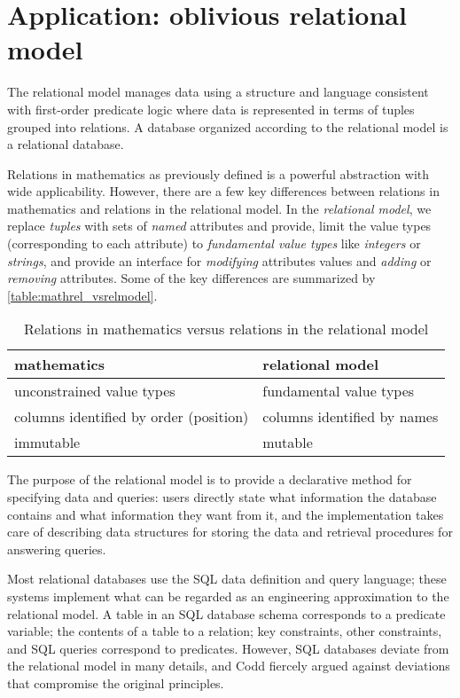 \documentclass[ ../main.tex]{subfiles}
\begin{document}
\section{Application: oblivious relational model}
The relational model manages data using a structure and language consistent with first-order predicate logic\cite{} where data is represented in terms of tuples grouped into relations. A database organized according to the relational model is a relational database.

Relations in mathematics as previously defined is a powerful abstraction with wide applicability. However, there are a few key differences between relations in mathematics and relations in the relational model. In the \emph{relational model}, we replace \emph{tuples} with sets of \emph{named} attributes and provide, limit the value types (corresponding to each attribute) to \emph{fundamental value types} like \emph{integers} or \emph{strings}, and provide an interface for \emph{modifying} attributes values and \emph{adding} or \emph{removing} attributes. Some of the key differences are summarized by \cref{table:mathrel_vsrelmodel}.
\begin{table}
    \label{tab:mathrel_vsrelmodel}
    \centering
    \caption{Relations in mathematics versus relations in the relational model}
    \begin{tabular}{l l}
        \toprule
        mathematics & relational model\\
        \midrule
        unconstrained value types               & fundamental value types\\
        columns identified by order (position)  & columns identified by names\\
        immutable                               & mutable\\
        \bottomrule
    \end{tabular}
\end{table}

The purpose of the relational model is to provide a declarative method for specifying data and queries: users directly state what information the database contains and what information they want from it, and the implementation takes care of describing data structures for storing the data and retrieval procedures for answering queries.

Most relational databases use the SQL data definition and query language; these systems implement what can be regarded as an engineering approximation to the relational model. A table in an SQL database schema corresponds to a predicate variable; the contents of a table to a relation; key constraints, other constraints, and SQL queries correspond to predicates. However, SQL databases deviate from the relational model in many details, and Codd fiercely argued against deviations that compromise the original principles.
\end{document}
